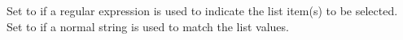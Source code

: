     Set to \gdrefbooleantrue if a regular expression is used to
  indicate the list item(s) to be selected. Set to \gdrefbooleanfalse
  if a normal string is used to match the list values.
